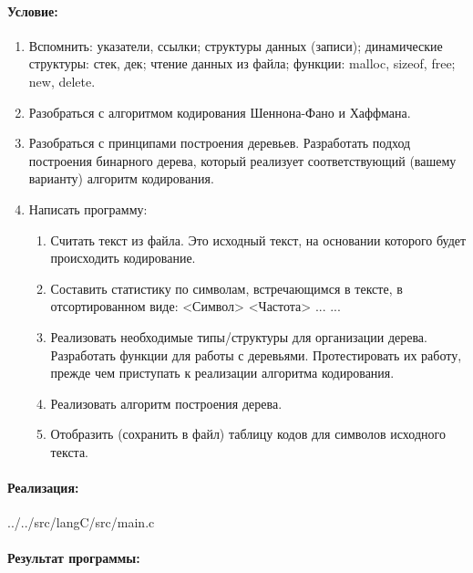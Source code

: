 \paragraph{Условие:} \hspace{0pt}

\begin{enumerate}
    \item Вспомнить: указатели, ссылки; структуры данных (записи); динамические структуры: стек, дек; чтение данных из файла; функции: malloc, sizeof, free; new, delete.
    \item Разобраться с алгоритмом кодирования Шеннона-Фано и Хаффмана.
    \item Разобраться с принципами построения деревьев. Разработать подход построения бинарного дерева, который реализует соответствующий (вашему варианту) алгоритм кодирования.
    \item Написать программу:
    \begin{enumerate}
        \item Считать текст из файла. Это исходный текст, на основании которого будет происходить кодирование.
        \item Составить статистику по символам, встречающимся в тексте, в отсортированном виде: <Символ> <Частота> ... ...
        \item Реализовать необходимые типы/структуры для организации дерева. Разработать функции для работы с деревьями. Протестировать их работу, прежде чем приступать к реализации алгоритма кодирования.
        \item Реализовать алгоритм построения дерева.
        \item Отобразить (сохранить в файл) таблицу кодов для символов исходного текста.
    \end{enumerate}
\end{enumerate}

\newpage


\paragraph{Реализация:} \hspace{0pt}


{../../src/langC/src/main.c}

\newpage


\paragraph{Результат программы:} \hspace{0pt}

